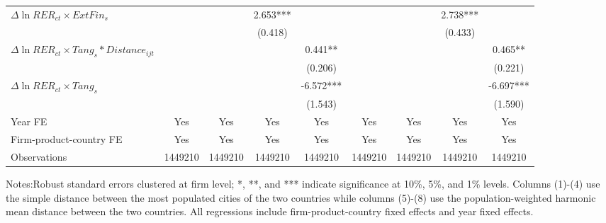 \begin{table}
{\begin{threeparttable}
\begin{tabular}{lcccccccc}
				$\Delta \ln RER_{ct} \times ExtFin_{s}$ &    &       & 2.653*** &       &       &       & 2.738*** &  \\
				&    &       & (0.418) &       &       &       & (0.433) &  \\
				$\Delta \ln RER_{ct} \times Tang_{s}*Distance_{ijt}$ &     &       &       & 0.441** &       &       &       & 0.465** \\
				&    &       &       & (0.206) &       &       &       & (0.221) \\
				$\Delta \ln RER_{ct} \times Tang_{s}$ &    &       &       & -6.572*** &       &       &       & -6.697*** \\
				&     &       &       & (1.543) &       &       &       & (1.590) \\
                    \midrule
				Year FE  & Yes   & Yes   & Yes   & Yes & Yes   & Yes   & Yes   & Yes\\
				Firm-product-country FE & Yes   & Yes   & Yes   & Yes & Yes   & Yes   & Yes   & Yes\\
				Observations & 1449210 & 1449210 & 1449210 & 1449210 & 1449210 & 1449210 & 1449210 & 1449210\\
				\bottomrule
			\end{tabular}
			\begin{tablenotes}
				\footnotesize
				\item Notes:Robust standard errors clustered at firm level; *, **, and *** indicate significance at 10\%, 5\%, and 1\% levels. Columns (1)-(4) use the simple distance between the most populated cities of the two countries while columns (5)-(8) use the population-weighted harmonic mean distance between the two countries. All regressions include firm-product-country fixed effects and year fixed effects.
			\end{tablenotes}
		\end{threeparttable}
	}
	\label{tab.source.distance}
\end{table}

